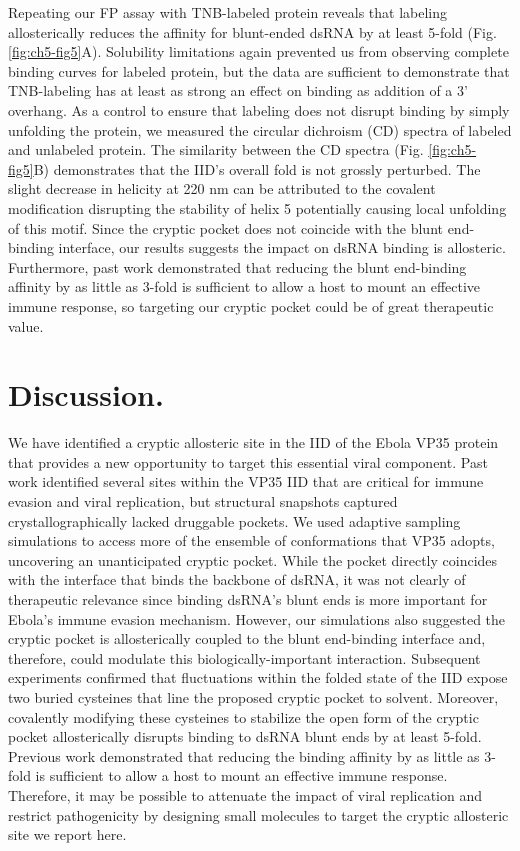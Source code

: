 \documentclass[../main.tex]{subfiles}
\begin{document}
        Repeating our FP assay with TNB-labeled protein reveals that labeling allosterically reduces the affinity for blunt-ended dsRNA by at least 5-fold (Fig. \ref{fig:ch5-fig5}A). Solubility limitations again prevented us from observing complete binding curves for labeled protein, but the data are sufficient to demonstrate that TNB-labeling has at least as strong an effect on binding as addition of a 3’ overhang. As a control to ensure that labeling does not disrupt binding by simply unfolding the protein, we measured the circular dichroism (CD) spectra of labeled and unlabeled protein. The similarity between the CD spectra (Fig. \ref{fig:ch5-fig5}B) demonstrates that the IID’s overall fold is not grossly perturbed. The slight decrease in helicity at 220 nm can be attributed to the covalent modification disrupting the stability of helix 5 potentially causing local unfolding of this motif. Since the cryptic pocket does not coincide with the blunt end-binding interface, our results suggests the impact on dsRNA binding is allosteric. Furthermore, past work demonstrated that reducing the blunt end-binding affinity by as little as 3-fold is sufficient to allow a host to mount an effective immune response\cite{leung_structural_2010}, so targeting our cryptic pocket could be of great therapeutic value.

\section{Discussion.}
    We have identified a cryptic allosteric site in the IID of the Ebola VP35 protein that provides a new opportunity to target this essential viral component. Past work identified several sites within the VP35 IID that are critical for immune evasion and viral replication\cite{messaoudi_filovirus_2015,hartman_c-terminal_2004,prins_mutations_2010,prins_basic_2010}, but structural snapshots captured crystallographically lacked druggable pockets\cite{leung_structure_2009,leung_structural_2010}. We used adaptive sampling simulations to access more of the ensemble of conformations that VP35 adopts, uncovering an unanticipated cryptic pocket. While the pocket directly coincides with the interface that binds the backbone of dsRNA, it was not clearly of therapeutic relevance since binding dsRNA’s blunt ends is more important for Ebola’s immune evasion mechanism\cite{edwards_differential_2016}. However, our simulations also suggested the cryptic pocket is allosterically coupled to the blunt end-binding interface and, therefore, could modulate this biologically-important interaction. Subsequent experiments confirmed that fluctuations within the folded state of the IID expose two buried cysteines that line the proposed cryptic pocket to solvent. Moreover, covalently modifying these cysteines to stabilize the open form of the cryptic pocket allosterically disrupts binding to dsRNA blunt ends by at least 5-fold. Previous work demonstrated that reducing the binding affinity by as little as 3-fold is sufficient to allow a host to mount an effective immune response\cite{leung_structural_2010}. Therefore, it may be possible to attenuate the impact of viral replication and restrict pathogenicity by designing small molecules to target the cryptic allosteric site we report here.
\end{document}
